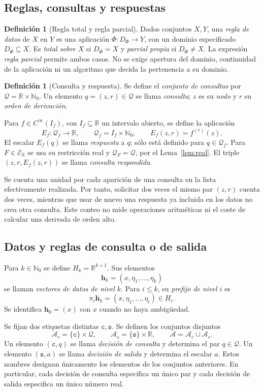 \documentclass[11pt,a4paper]{article}
\numberwithin{equation}{section}
\theoremstyle{definition}
\newtheorem{definition}[theorem]{Definición}
\theoremstyle{remark}
\newcommand{\R}{\mathbb R}
\newcommand{\Nn}{\mathbb N_0}
\newcommand{\ER}{\mathcal E_{\R}}
\newcommand{\QQ}{\mathcal Q}
\newcommand{\hc}{\mathbf h}
\newcommand{\ct}{\mathtt c}
\newcommand{\st}{\mathtt s}
\begin{document}
\subsection{Reglas, consultas y respuestas}
\begin{definition}[Regla total y regla parcial]\label{def:rule}
Dados conjuntos $X,Y$, una \emph{regla de datos} de $X$ en $Y$ es una aplicación $\Phi:D_\Phi\to Y$, con un dominio especificado $D_\Phi\subseteq X$. Es \emph{total sobre $X$} si $D_\Phi=X$ y \emph{parcial propia} si $D_\Phi\ne X$. La expresión \emph{regla parcial} permite ambos casos. No se exige apertura del dominio, continuidad de la aplicación ni un algoritmo que decida la pertenencia a su dominio.
\end{definition}

\begin{definition}[Consulta y respuesta]\label{def:query}
Se define el \emph{conjunto de consultas} por $\QQ=\R\times\Nn$. Un elemento $q=(z,r)\in\QQ$ se llama \emph{consulta}; $z$ es su \emph{nodo} y $r$ su \emph{orden de derivación}.

Para $f\in C^\infty(I_f)$, con $I_f\subseteq\R$ un intervalo abierto, se define la aplicación
\[
E_f:\QQ_f\to\R,\qquad
\QQ_f=I_f\times\Nn,\qquad E_f(z,r)=f^{(r)}(z).
\]
El escalar $E_f(q)$ se llama \emph{respuesta} a $q$; sólo está definido para $q\in\QQ_f$. Para $F\in\ER$ se usa su restricción real y $\QQ_F=\QQ$, por el Lema~\ref{lem:real}. El triple $(z,r,E_f(z,r))$ se llama \emph{consulta respondida}.
\end{definition}

Se cuenta una unidad por cada aparición de una consulta en la lista efectivamente realizada. Por tanto, solicitar dos veces el mismo par $(z,r)$ cuenta dos veces, mientras que usar de nuevo una respuesta ya incluida en los datos no crea otra consulta. Este conteo no mide operaciones aritméticas ni el coste de calcular una derivada de orden alto.

\subsection{Datos y reglas de consulta o de salida}
Para $k\in\Nn$ se define $H_k=\R^{k+1}$. Sus elementos
\[
\hc_k=(x,\eta_1,\ldots,\eta_k)
\]
se llaman \emph{vectores de datos de nivel $k$}. Para $i\le k$, su \emph{prefijo de nivel $i$} es
\[
\pi_i\hc_k=(x,\eta_1,\ldots,\eta_i)\in H_i.
\]
Se identifica $\hc_0=(x)$ con $x$ cuando no haya ambigüedad.

Se fijan dos etiquetas distintas $\ct,\st$. Se definen los conjuntos disjuntos
\[
\mathcal A_c=\{\ct\}\times\QQ,\qquad
\mathcal A_s=\{\st\}\times\R,\qquad
\mathcal A=\mathcal A_c\cup\mathcal A_s.
\]
Un elemento $(\ct,q)$ se llama \emph{decisión de consulta} y determina el par $q\in\QQ$. Un elemento $(\st,a)$ se llama \emph{decisión de salida} y determina el escalar $a$. Estos nombres designan únicamente los elementos de los conjuntos anteriores. En particular, cada decisión de consulta especifica un único par y cada decisión de salida especifica un único número real.
\end{document}
